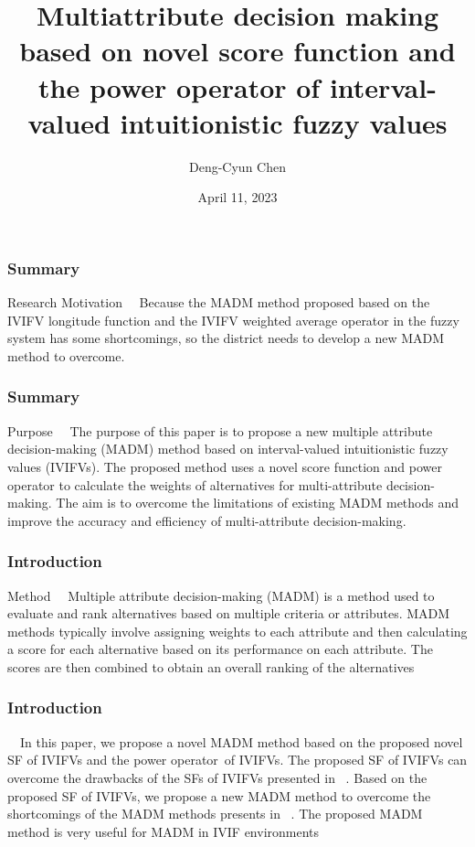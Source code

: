 \documentclass{beamer}
\title{
    Multiattribute decision making based on novel score function
and the power operator of interval-valued intuitionistic fuzzy
values
}
\author{
    Deng-Cyun Chen
}
\institute{\texttt{
    M11115101@gapps.ntust.edu.tw
}}
\date{
    April 11, 2023 %
}
\begin{document}
\begin{frame}
\placelogofalse
\titlepage
\end{frame}
\placelogotrue

\begin{frame}[fragile]
	\frametitle{Summary}
	\begin{block}{Research Motivation}{}
    \ \ Because the MADM method proposed based on the IVIFV longitude function and the IVIFV weighted average operator in the fuzzy system has some shortcomings, so the district needs to develop a new MADM method to overcome.
	\end{block}
\end{frame}
\begin{frame}[fragile]
    \frametitle{Summary}
    \begin{block}{Purpose}
    \ \ The purpose of this paper is to propose a new multiple attribute decision-making (MADM) method based on interval-valued intuitionistic fuzzy values (IVIFVs). The proposed method uses a novel score function and power operator to calculate the weights of alternatives for multi-attribute decision-making. The aim is to overcome the limitations of existing MADM methods and improve the accuracy and efficiency of multi-attribute decision-making.
    \end{block}
\end{frame}
\begin{frame}[fragile]
	\frametitle{Introduction}
	\begin{block}{Method}{}
    \ \ Multiple attribute decision-making (MADM) is a method used to evaluate and rank alternatives based on multiple criteria or attributes. MADM methods typically involve assigning weights to each attribute and then calculating a score for each alternative based on its performance on each attribute. The scores are then combined to obtain an overall ranking of the alternatives
	\end{block}
\end{frame}
\begin{frame}[fragile]
	\frametitle{Introduction}
	\begin{block}{}
	\ \ In this paper, we propose a novel MADM method based on the proposed novel SF of IVIFVs and the power operator~\cite{An2007}of IVIFVs. The proposed SF of IVIFVs can overcome the drawbacks of the SFs of IVIFVs presented in ~\cite{Bai2013}. Based on the proposed SF of IVIFVs, we propose a new MADM method to overcome the shortcomings of the MADM methods presents in ~\cite{chen1997}. The proposed MADM method is very useful for MADM in IVIF environments
	\end{block}
\end{frame}
\end{document}
